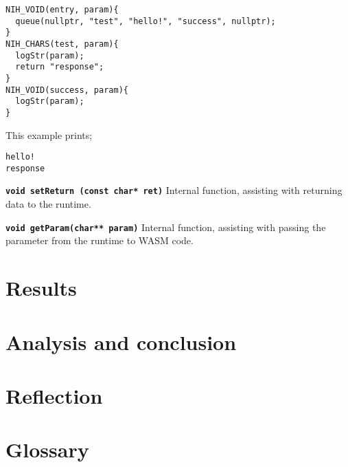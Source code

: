 \documentclass{article}
\begin{document}
\begin{tcolorbox}[colback=white,grow to left by=2.5mm,grow to right by=2.5mm,left*=0mm,right*=0mm,sharp corners]
\begin{verbatim}
NIH_VOID(entry, param){
  queue(nullptr, "test", "hello!", "success", nullptr);
}
NIH_CHARS(test, param){
  logStr(param);
  return "response";
}
NIH_VOID(success, param){
  logStr(param);
}
\end{verbatim}
\end{tcolorbox}
This example prints;
\begin{tcolorbox}[colback=white,grow to left by=2.5mm,grow to right by=2.5mm,left*=0mm,right*=0mm,sharp corners]
\begin{verbatim}
hello!
response
\end{verbatim}
\end{tcolorbox}
\textbf{\texttt{void setReturn (const char* ret)}}\newline
Internal function, assisting with returning data to the runtime.

\textbf{\texttt{void getParam(char** param)}}\newline
Internal function, assisting with passing the parameter from the runtime to WASM code.




\section{Results}


\section{Analysis and conclusion}


\section{Reflection}

\section{Glossary}
\end{document}
